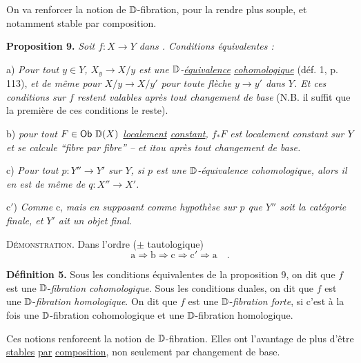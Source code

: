 
On va renforcer la notion de $\mathbb{D}$-fibration, pour la rendre plus souple, et notamment stable par composition.

\textbf{Proposition 9.} \textit{Soit $f : X \to Y$ dans \Dia. Conditions équivalentes :}

a) \textit{Pour tout $y \in Y$, $X_y \to X/y$ est une $\mathbb{D}$-\underline{équivalence} \underline{cohomologique}} (déf. 1, p. 113), \textit{et de même pour $X/y \to X/y'$ pour toute flèche $y \to y'$ dans $Y$. Et ces conditions sur $f$ restent valables après tout changement de base} (N.B. il suffit que la première de ces conditions le reste).

b) \textit{pour tout $F \in \mathsf{Ob}\ \mathbb{D}(X)$ \underline{localement} \underline{constant}, $f_*F$ est localement constant sur $Y$ et se calcule “fibre par fibre” -- et itou après tout changement de base.} %

c) \textit{Pour tout $p : Y'' \to Y'$ sur $Y$, si $p$ est une $\mathbb{D}$-équivalence cohomologique, alors il en est de même de $q : X'' \to X'$.}

c$'$) \textit{Comme} c, \textit{mais en supposant comme hypothèse sur $p$ que $Y''$ soit la catégorie finale, et $Y'$ ait un objet final.}

\textsc{Démonstration}. Dans l'ordre ($\pm$ tautologique)
\[
\mathrm{a} \Longrightarrow \mathrm{b} \Longrightarrow \mathrm{c} \Longrightarrow \mathrm{c}' \Longrightarrow \mathrm{a} \quad .
\]

\textbf{Définition 5.} Sous les conditions équivalentes de la proposition 9, on dit que $f$ est une $\mathbb{D}$-\textit{fibration cohomologique}. Sous les conditions duales, on dit que $f$ est une $\mathbb{D}$-\textit{fibration homologique}. On dit que $f$ est une $\mathbb{D}$-\textit{fibration forte}, si c'est à la fois une $\mathbb{D}$-fibration cohomologique et une $\mathbb{D}$-fibration homologique.

Ces notions renforcent la notion de $\mathbb{D}$-fibration. Elles ont l'avantage de plus d'être \underline{stables} \underline{par} \underline{composition}, non seulement par changement de base.

